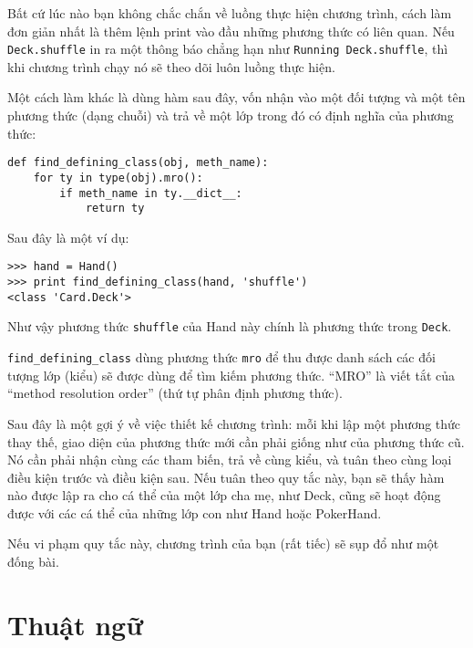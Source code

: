 \documentclass[11pt]{book}
\begin{document}
Bất cứ lúc nào bạn không chắc chắn về luồng thực hiện chương trình,
cách làm đơn giản nhất là thêm lệnh print vào đầu những
phương thức có liên quan. Nếu {\tt Deck.shuffle} in ra một
thông báo chẳng hạn như {\tt Running Deck.shuffle}, thì khi
chương trình chạy nó sẽ theo dõi luôn luồng thực hiện.

Một cách làm khác là dùng hàm sau đây, vốn nhận vào một 
đối tượng và một tên phương thức (dạng chuỗi) và trả về một lớp
trong đó có định nghĩa của phương thức:

\beforeverb
\begin{verbatim}
def find_defining_class(obj, meth_name):
    for ty in type(obj).mro():
        if meth_name in ty.__dict__:
            return ty
\end{verbatim}
\afterverb
%
Sau đây là một ví dụ:

\beforeverb
\begin{verbatim}
>>> hand = Hand()
>>> print find_defining_class(hand, 'shuffle')
<class 'Card.Deck'>
\end{verbatim}
\afterverb
%
Như vậy phương thức {\tt shuffle} của Hand này chính là phương thức trong {\tt Deck}.


\verb"find_defining_class" dùng phương thức {\tt mro} để thu được danh sách
các đối tượng lớp (kiểu) sẽ được dùng để tìm kiếm phương thức.  ``MRO''
là viết tắt của ``method resolution order'' (thứ tự phân định phương thức).


Sau đây là một gợi ý về việc thiết kế chương trình: mỗi khi lập
một phương thức thay thế, giao diện của phương thức mới cần phải giống
như của phương thức cũ. Nó cần phải nhận cùng các tham biến, trả về
cùng kiểu, và tuân theo cùng loại điều kiện trước và điều kiện sau.
Nếu tuân theo quy tắc này, bạn sẽ thấy hàm nào được lập ra cho cá thể
của một lớp cha mẹ, như Deck, cũng sẽ hoạt động được với các cá thể
của những lớp con như Hand hoặc PokerHand.

Nếu vi phạm quy tắc này, chương trình của bạn (rất tiếc) sẽ 
sụp đổ như một đống bài.


\section{Thuật ngữ}
\end{document}
